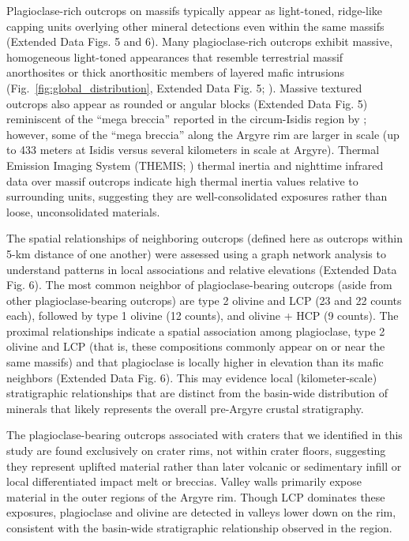 \documentclass[12pt]{article}
\begin{document}
Plagioclase-rich outcrops on massifs typically appear as light-toned, ridge-like capping units overlying other mineral detections even within the same massifs (Extended Data Figs. 5 and 6). Many plagioclase-rich outcrops exhibit massive, homogeneous light-toned appearances that resemble terrestrial massif anorthosites or thick anorthositic members of layered mafic intrusions (Fig.~\ref{fig:global_distribution}, Extended Data Fig. 5; \citealt{Ashwal1993}). Massive textured outcrops also appear as rounded or angular blocks (Extended Data Fig. 5) reminiscent of the ``mega breccia'' reported in the circum-Isidis region by \citet{Scheller2020}; however, some of the ``mega breccia'' along the Argyre rim are larger in scale (up to 433 meters at Isidis versus several kilometers in scale at Argyre). Thermal Emission Imaging System (THEMIS; \citealt{Christensen2004}) thermal inertia \citep{Fergason2006} and nighttime infrared data \citep{Edwards2011} over massif outcrops indicate high thermal inertia values relative to surrounding units, suggesting they are well-consolidated exposures rather than loose, unconsolidated materials.

The spatial relationships of neighboring outcrops (defined here as outcrops within 5-km distance of one another) were assessed using a graph network analysis to understand patterns in local associations and relative elevations (Extended Data Fig. 6). The most common neighbor of plagioclase-bearing outcrops (aside from other plagioclase-bearing outcrops) are type 2 olivine and LCP (23 and 22 counts each), followed by type 1 olivine (12 counts), and olivine + HCP (9 counts). The proximal relationships indicate a spatial association among plagioclase, type 2 olivine and LCP (that is, these compositions commonly appear on or near the same massifs) and that plagioclase is locally higher in elevation than its mafic neighbors (Extended Data Fig. 6). This may evidence local (kilometer-scale) stratigraphic relationships that are distinct from the basin-wide distribution of minerals that likely represents the overall pre-Argyre crustal stratigraphy.

The plagioclase-bearing outcrops associated with craters that we identified in this study are found exclusively on crater rims, not within crater floors, suggesting they represent uplifted material rather than later volcanic or sedimentary infill or local differentiated impact melt or breccias. Valley walls primarily expose material in the outer regions of the Argyre rim. Though LCP dominates these exposures, plagioclase and olivine are detected in valleys lower down on the rim, consistent with the basin-wide stratigraphic relationship observed in the region.
\end{document}
